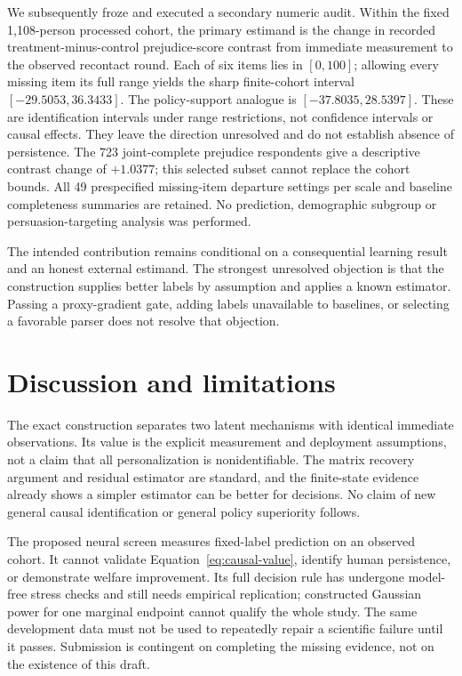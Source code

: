 \documentclass{article}
\begin{document}
We subsequently froze and executed a secondary numeric audit. Within the fixed
1,108-person processed cohort, the primary estimand is the change in recorded
treatment-minus-control prejudice-score contrast from immediate measurement to
the observed recontact round. Each of six items lies in $[0,100]$; allowing
every missing item its full range yields the sharp finite-cohort interval
$[-29.5053,36.3433]$. The policy-support analogue is $[-37.8035,28.5397]$.
These are identification intervals under range restrictions, not confidence
intervals or causal effects. They leave the direction unresolved and do not
establish absence of persistence. The 723 joint-complete prejudice respondents
give a descriptive contrast change of $+1.0377$; this selected subset cannot
replace the cohort bounds. All 49 prespecified missing-item departure settings
per scale and baseline completeness summaries are retained. No prediction,
demographic subgroup or persuasion-targeting analysis was performed.

The intended contribution remains conditional on a consequential learning
result and an honest external estimand. The strongest unresolved objection is
that the construction supplies better labels by assumption and applies a known
estimator. Passing a proxy-gradient gate, adding labels unavailable to baselines,
or selecting a favorable parser does not resolve that objection.

\section{Discussion and limitations}
The exact construction separates two latent mechanisms with identical immediate
observations. Its value is the explicit measurement and deployment assumptions,
not a claim that all personalization is nonidentifiable. The matrix recovery
argument and residual estimator are standard, and the finite-state evidence
already shows a simpler estimator can be better for decisions. No claim of
new general causal identification or general policy superiority follows.

The proposed neural screen measures fixed-label prediction on an observed
cohort. It cannot validate Equation~\ref{eq:causal-value}, identify human
persistence, or demonstrate welfare improvement. Its full decision rule has
undergone model-free stress checks and still needs empirical replication;
constructed Gaussian power for one marginal endpoint cannot qualify the whole
study. The same development data must not be used to repeatedly repair a
scientific failure until it passes. Submission is contingent on completing
the missing evidence, not on the existence of this draft.
\end{document}
